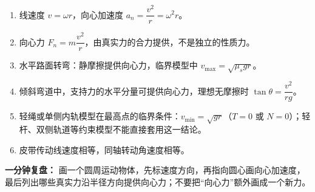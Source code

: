 {\small
\begin{enumerate}[nosep]
  \item 线速度 $v = \omega r$，向心加速度 $a_n = \dfrac{v^2}{r} = \omega^2 r$。
  \item 向心力 $F_n = m\dfrac{v^2}{r}$，由真实力的合力提供，不是独立的性质力。
  \item 水平路面转弯：静摩擦提供向心力，临界模型中 $v_{\max} = \sqrt{\mu_s g r}$。
  \item 倾斜弯道中，支持力的水平分量可提供向心力，理想无摩擦时 $\tan\theta=\dfrac{v^2}{rg}$。
  \item 轻绳或单侧内轨模型在最高点的临界条件：$v_{\min} = \sqrt{gr}$（$T=0$ 或 $N=0$）；轻杆、双侧轨道等约束模型不能直接套用这一结论。
  \item 皮带传动线速度相等，同轴转动角速度相等。
\end{enumerate}

\textbf{一分钟复盘：} 画一个圆周运动物体，先标速度方向，再指向圆心画向心加速度，最后列出哪些真实力沿半径方向提供向心力；不要把“向心力”额外画成一个新力。
}
